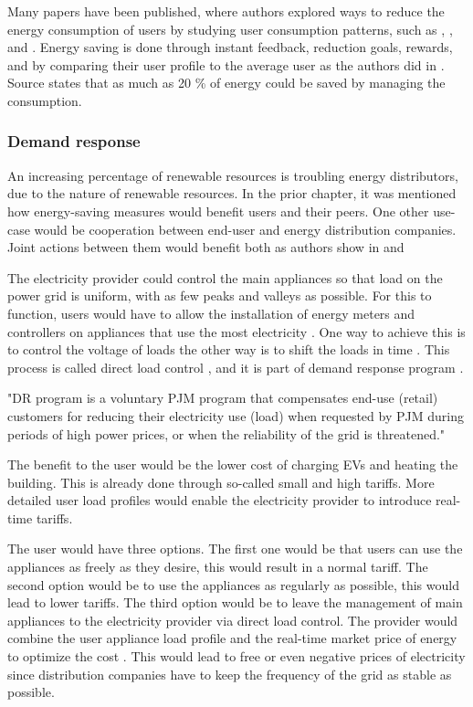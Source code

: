 Many papers have been published, where authors explored ways to reduce the energy consumption of users by studying user consumption patterns,
such as \cite{energy_saving3}, \cite{energy_saving1}, \cite{energy_saving4} and \cite{energy_saving3}.
Energy saving is done through instant feedback, reduction goals, rewards, and by comparing their user profile to the average user as the authors did in \cite{Csoknyai2019}.
Source \cite{eu2006} states that as much as 20 \% of energy could be saved by managing the consumption.

\subsubsection{Demand response}

An increasing percentage of renewable resources is troubling energy distributors, due to the nature of renewable resources.
In the prior chapter, it was mentioned how energy-saving measures would benefit users and their peers.
One other use-case would be cooperation between end-user and energy distribution companies.
Joint actions between them would benefit both as authors show in \cite{cooperation2008} and \cite{cooperation2010}

The electricity provider could control the main appliances so that load on the power grid is uniform,
with as few peaks and valleys as possible. For this to function, users would have to allow the installation of energy meters and controllers 
on appliances that use the most electricity \cite{gridDirectControll2015}. One way to achieve this is to control the voltage of loads \cite{controll2014} the other
way is to shift the loads in time \cite{shift2015}.
This process is called direct load control \cite{DirectLoadControll2021}, and it is part of demand response program \cite{DemandResponse2018}.

"DR program is a voluntary PJM program that compensates end-use (retail) customers for reducing their electricity use (load)
when requested by PJM during periods of high power prices, or when the reliability of the grid is threatened." \cite{DemandResponse2018}

The benefit to the user would be the lower cost of charging EVs and heating the building.
This is already done through so-called small and high tariffs.
More detailed user load profiles would enable the electricity provider to introduce real-time tariffs.

The user would have three options. The first one would be that users can use the appliances as freely as they desire, this would result in a normal tariff.
The second option would be to use the appliances as regularly as possible, this would lead to lower tariffs.
The third option would be to leave the management of main appliances to the electricity provider via direct load control.
The provider would combine the user appliance load profile and the real-time market price of energy to optimize the cost \cite{optimiseCostShift2015}.
This would lead to free or even negative prices of electricity since distribution companies have to keep the frequency of the grid as stable as possible.

